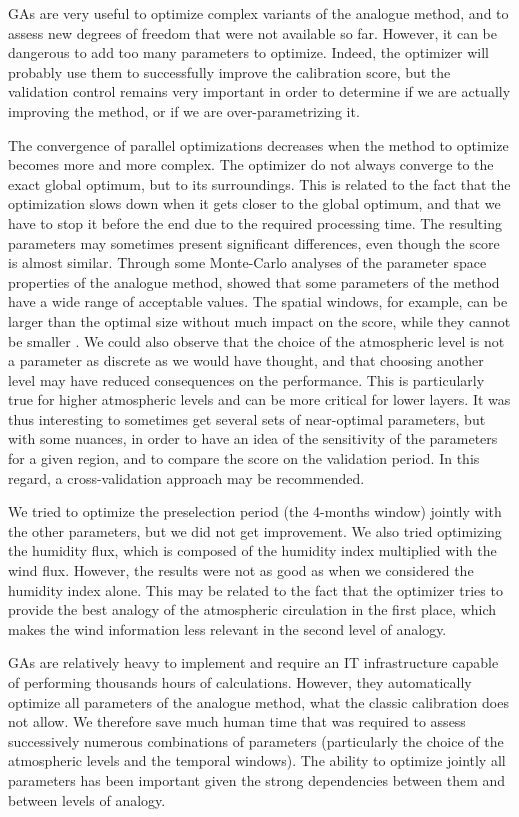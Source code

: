 \documentclass[twocol]{ametsoc}
\begin{document}
GAs are very useful to optimize complex variants of the analogue method, and to assess new degrees of freedom that were not available so far. However, it can be dangerous to add too many parameters to optimize. Indeed, the optimizer will probably use them to successfully improve the calibration score, but the validation control remains very important in order to determine if we are actually improving the method, or if we are over-parametrizing it.

The convergence of parallel optimizations decreases when the method to optimize becomes more and more complex. The optimizer do not always converge to the exact global optimum, but to its surroundings. This is related to the fact that the optimization slows down when it gets closer to the global optimum, and that we have to stop it before the end due to the required processing time. The resulting parameters may sometimes present significant differences, even though the score is almost similar. Through some Monte-Carlo analyses of the parameter space properties of the analogue method, \citet{Horton2012a} showed that some parameters of the method have a wide range of acceptable values. The spatial windows, for example, can be larger than the optimal size without much impact on the score, while they cannot be smaller \citep[see also][]{Bontron2004}. We could also observe that the choice of the atmospheric level is not a parameter as discrete as we would have thought, and that choosing another level may have reduced consequences on the performance. This is particularly true for higher atmospheric levels and can be more critical for lower layers. It was thus interesting to sometimes get several sets of near-optimal parameters, but with some nuances, in order to have an idea of the sensitivity of the parameters for a given region, and to compare the score on the validation period. In this regard, a cross-validation approach may be recommended.

We tried to optimize the preselection period (the 4-months window) jointly with the other parameters, but we did not get improvement. We also tried optimizing the humidity flux, which is composed of the humidity index multiplied with the wind flux. However, the results were not as good as when we considered the humidity index alone. This may be related to the fact that the optimizer tries to provide the best analogy of the atmospheric circulation in the first place, which makes the wind information less relevant in the second level of analogy.

GAs are relatively heavy to implement and require an IT infrastructure capable of performing thousands hours of calculations. However, they automatically optimize all parameters of the analogue method, what the classic calibration does not allow. We therefore save much human time that was required to assess successively numerous combinations of parameters (particularly the choice of the atmospheric levels and the temporal windows). The ability to optimize jointly all parameters has been important given the strong dependencies between them and between levels of analogy.
\end{document}
